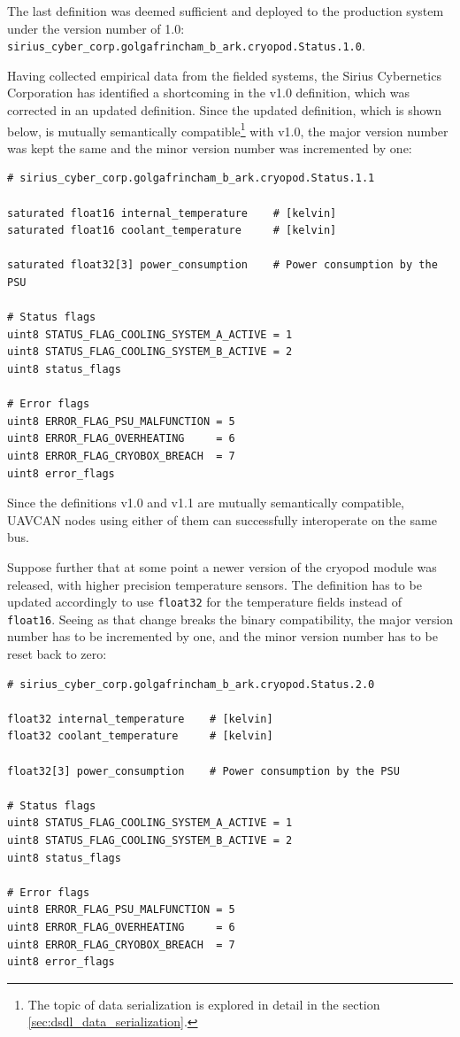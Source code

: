 The last definition was deemed sufficient and deployed to the production system
under the version number of 1.0: \verb|sirius_cyber_corp.golgafrincham_b_ark.cryopod.Status.1.0|.

Having collected empirical data from the fielded systems, the Sirius Cybernetics Corporation has
identified a shortcoming in the v1.0 definition, which was corrected in an updated definition.
Since the updated definition, which is shown below, is mutually semantically
compatible\footnote{The topic of data serialization is explored in detail in the section
\ref{sec:dsdl_data_serialization}.}
with v1.0, the major version number was kept the same and the minor version number was incremented by one:

\begin{verbatim}
# sirius_cyber_corp.golgafrincham_b_ark.cryopod.Status.1.1

saturated float16 internal_temperature    # [kelvin]
saturated float16 coolant_temperature     # [kelvin]

saturated float32[3] power_consumption    # Power consumption by the PSU

# Status flags
uint8 STATUS_FLAG_COOLING_SYSTEM_A_ACTIVE = 1
uint8 STATUS_FLAG_COOLING_SYSTEM_B_ACTIVE = 2
uint8 status_flags

# Error flags
uint8 ERROR_FLAG_PSU_MALFUNCTION = 5
uint8 ERROR_FLAG_OVERHEATING     = 6
uint8 ERROR_FLAG_CRYOBOX_BREACH  = 7
uint8 error_flags
\end{verbatim}

Since the definitions v1.0 and v1.1 are mutually semantically compatible,
UAVCAN nodes using either of them can successfully interoperate on the same bus.

Suppose further that at some point a newer version of the cryopod module was released,
with higher precision temperature sensors.
The definition has to be updated accordingly to use \verb|float32| for the temperature fields
instead of \verb|float16|.
Seeing as that change breaks the binary compatibility,
the major version number has to be incremented by one, and the minor version number has to be reset back to zero:

\begin{verbatim}
# sirius_cyber_corp.golgafrincham_b_ark.cryopod.Status.2.0

float32 internal_temperature    # [kelvin]
float32 coolant_temperature     # [kelvin]

float32[3] power_consumption    # Power consumption by the PSU

# Status flags
uint8 STATUS_FLAG_COOLING_SYSTEM_A_ACTIVE = 1
uint8 STATUS_FLAG_COOLING_SYSTEM_B_ACTIVE = 2
uint8 status_flags

# Error flags
uint8 ERROR_FLAG_PSU_MALFUNCTION = 5
uint8 ERROR_FLAG_OVERHEATING     = 6
uint8 ERROR_FLAG_CRYOBOX_BREACH  = 7
uint8 error_flags
\end{verbatim}

